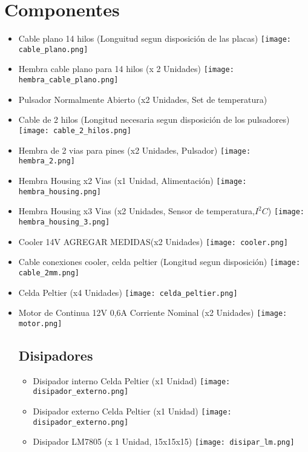 \documentclass[a4paper]{article}
\numberwithin{equation}{section}
\numberwithin{figure}{section}
\begin{document}
\section{Componentes}
\begin{itemize}

\item Cable plano 14 hilos (Longuitud segun disposición de las placas)
\texttt{[image: cable\_plano.png]}
\item Hembra cable plano para 14 hilos (x 2 Unidades)
\texttt{[image: hembra\_cable\_plano.png]}
\item Pulsador Normalmente Abierto (x2 Unidades, Set de temperatura)

\item Cable de 2 hilos (Longitud necesaria segun disposición de los pulsadores)
\texttt{[image: cable\_2\_hilos.png]}
\item Hembra de 2 vias para pines (x2 Unidades, Pulsador)
\texttt{[image: hembra\_2.png]}
\item Hembra Housing x2 Vias (x1 Unidad, Alimentación)
\texttt{[image: hembra\_housing.png]}
\item Hembra Housing x3 Vias (x2 Unidades, Sensor de temperatura,$I^{2}C$)
\texttt{[image: hembra\_housing\_3.png]} 
\item Cooler 14V AGREGAR MEDIDAS(x2 Unidades)
\texttt{[image: cooler.png]}
\item Cable conexiones cooler, celda peltier (Longitud segun disposición)
\texttt{[image: cable\_2mm.png]}
\item Celda Peltier (x4 Unidades)
\texttt{[image: celda\_peltier.png]}
\item Motor de Continua 12V 0,6A Corriente Nominal (x2 Unidades)
\texttt{[image: motor.png]}	


\subsection{Disipadores}
\begin{itemize}
\item Disipador interno Celda Peltier (x1 Unidad) \texttt{[image: disipador\_externo.png]}	
\item Disipador externo Celda Peltier (x1 Unidad)
\texttt{[image: disipador\_externo.png]}	
\item Disipador LM7805 (x 1 Unidad, 15x15x15)
\texttt{[image: disipar\_lm.png]}	
\end{itemize}


\end{itemize}
\end{document}
